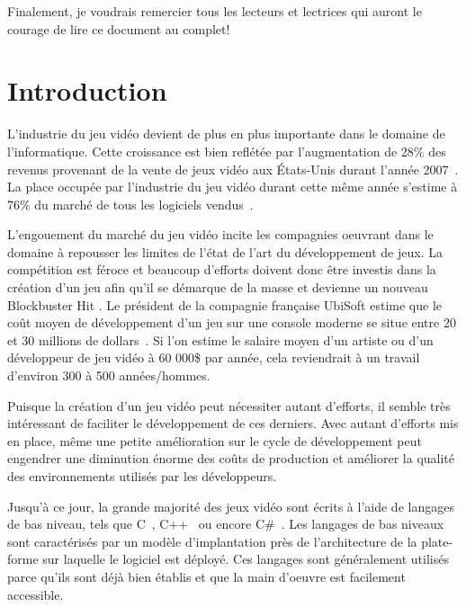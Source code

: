 \documentclass[12pt,twoside,letterpaper,francais]{book}
\begin{document}
Finalement, je voudrais remercier tous les lecteurs et lectrices qui
auront le courage de lire ce document au complet!

% 

\debutchapitres

\chapter{Introduction} \label{Chap:Intro}
L'industrie du jeu vidéo devient de plus en plus importante dans le
domaine de l'informatique. Cette croissance est bien reflétée par
l'augmentation de 28\% des revenus provenant de la vente de jeux vidéo
aux États-Unis durant l'année 2007~\cite{NPD_Games_2007}. La place
occupée par l'industrie du jeu vidéo durant cette même année s'estime
à 76\% du marché de tous les logiciels vendus~\cite{NPD_Soft_2008}. 

L'engouement du marché du jeu vidéo incite les compagnies oeuvrant
dans le domaine à repousser les limites de l'état de l'art du
développement de jeux. La compétition est féroce et beaucoup
d'efforts doivent donc être investis dans la création d'un jeu afin qu'il
se démarque de la masse et devienne un nouveau \og Blockbuster Hit
\fg. Le président de la compagnie française UbiSoft estime que le coût
moyen de développement d'un jeu sur une console moderne se situe entre
20 et 30 millions de dollars~\cite{cbc_ubisoft}. Si l'on estime le
salaire moyen d'un artiste ou d'un développeur de jeu vidéo à 60
000\$ par année, cela reviendrait à un travail d'environ 300 à 500
années/hommes.

Puisque la création d'un jeu vidéo peut nécessiter autant d'efforts,
il semble très intéressant de faciliter le développement de ces
derniers. Avec autant d'efforts mis en place, même une petite
amélioration sur le cycle de développement peut engendrer une
diminution énorme des coûts de production et améliorer la qualité des
environnements utilisés par les développeurs.

Jusqu'à ce jour, la grande majorité des jeux vidéo sont écrits à
l'aide de langages de bas niveau, tels que C~\cite{Ritchie-C-dev},
C++~\cite{cplusplus} ou encore C\#~\cite{CSHARP_SPEC}. Les langages de
bas niveaux sont caractérisés par un modèle d'implantation près de
l'architecture de la plate-forme sur laquelle le logiciel est
déployé. Ces langages sont généralement utilisés parce qu'ils sont
déjà bien établis et que la main d'oeuvre est facilement accessible.
\end{document}
